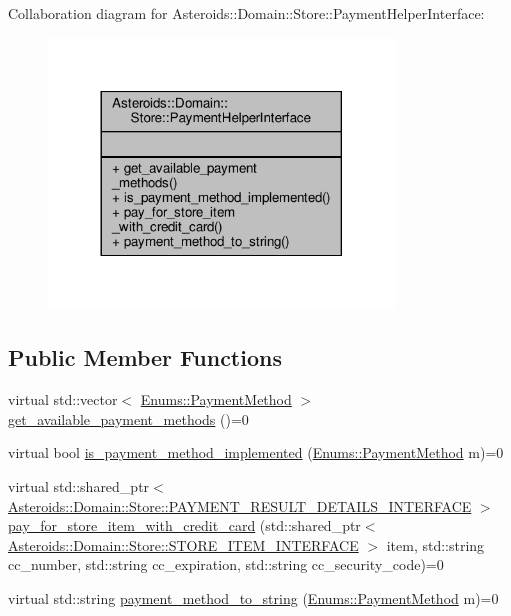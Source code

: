 Collaboration diagram for Asteroids\+:\+:Domain\+:\+:Store\+:\+:Payment\+Helper\+Interface\+:\nopagebreak
\begin{figure}[H]
\begin{center}
\leavevmode
\includegraphics[width=260pt]{classAsteroids_1_1Domain_1_1Store_1_1PaymentHelperInterface__coll__graph}
\end{center}
\end{figure}
\subsection*{Public Member Functions}
\begin{DoxyCompactItemize}
\item 
virtual std\+::vector$<$ \hyperlink{namespaceAsteroids_1_1Domain_1_1Store_1_1Enums_a0a0c269f6834cb8b1b6ed3bb02983564}{Enums\+::\+Payment\+Method} $>$ \hyperlink{classAsteroids_1_1Domain_1_1Store_1_1PaymentHelperInterface_adad811502d567c3f77636c4117998a0e}{get\+\_\+available\+\_\+payment\+\_\+methods} ()=0
\item 
virtual bool \hyperlink{classAsteroids_1_1Domain_1_1Store_1_1PaymentHelperInterface_ac07f8ba4559bd4df4623bf6b65bfaed8}{is\+\_\+payment\+\_\+method\+\_\+implemented} (\hyperlink{namespaceAsteroids_1_1Domain_1_1Store_1_1Enums_a0a0c269f6834cb8b1b6ed3bb02983564}{Enums\+::\+Payment\+Method} m)=0
\item 
virtual std\+::shared\+\_\+ptr$<$ \hyperlink{classAsteroids_1_1Domain_1_1Store_1_1PAYMENT__RESULT__DETAILS__INTERFACE}{Asteroids\+::\+Domain\+::\+Store\+::\+P\+A\+Y\+M\+E\+N\+T\+\_\+\+R\+E\+S\+U\+L\+T\+\_\+\+D\+E\+T\+A\+I\+L\+S\+\_\+\+I\+N\+T\+E\+R\+F\+A\+CE} $>$ \hyperlink{classAsteroids_1_1Domain_1_1Store_1_1PaymentHelperInterface_a0e5bbe982669558759c50a5741bcf6cf}{pay\+\_\+for\+\_\+store\+\_\+item\+\_\+with\+\_\+credit\+\_\+card} (std\+::shared\+\_\+ptr$<$ \hyperlink{classAsteroids_1_1Domain_1_1Store_1_1STORE__ITEM__INTERFACE}{Asteroids\+::\+Domain\+::\+Store\+::\+S\+T\+O\+R\+E\+\_\+\+I\+T\+E\+M\+\_\+\+I\+N\+T\+E\+R\+F\+A\+CE} $>$ item, std\+::string cc\+\_\+number, std\+::string cc\+\_\+expiration, std\+::string cc\+\_\+security\+\_\+code)=0
\item 
virtual std\+::string \hyperlink{classAsteroids_1_1Domain_1_1Store_1_1PaymentHelperInterface_ab0541525dcfd59b26763f1ce4c90aaae}{payment\+\_\+method\+\_\+to\+\_\+string} (\hyperlink{namespaceAsteroids_1_1Domain_1_1Store_1_1Enums_a0a0c269f6834cb8b1b6ed3bb02983564}{Enums\+::\+Payment\+Method} m)=0
\end{DoxyCompactItemize}


